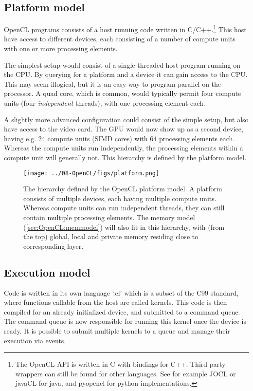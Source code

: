 \subsection{Platform model}
OpenCL programs consists of a host running code written in C/C++.\footnote{The OpenCL API is written in C with bindings for C++. Third party wrappers can still be found for other languages. See for example JOCL or javaCL for java, and pyopencl for python implementations.}
This host have access to different devices, each consisting of a number of compute units with one or more processing elements.

The simplest setup would consist of a single threaded host program running on the CPU. 
By querying for a platform and a device it can gain access to the CPU. 
This may seem illogical, but it is an easy way to program parallel on the processor.
A quad core, which is common, would typically permit four compute units (four \textit{independent} threads), with one processing element each.

A slightly more advanced configuration could consist of the simple setup, but also have access to the video card.
The GPU would now show up as a second device, having e.g. 24 compute units (SIMD cores) with 64 processing elements each. Whereas the compute units run independently, the processing elements within a compute unit will generally not.
This hierarchy is defined by the platform model.

\begin{figure}
\begin{center}
\texttt{[image: ../08-OpenCL/figs/platform.png]}
\caption{The hierarchy defined by the OpenCL platform model.
A platform consists of multiple devices, each having multiple compute units. Whereas compute units can run independent threads, they can still contain multiple processing elements.
The memory model (\ref{sec:OpenCL:memmodel}) will also fit in this hierarchy, with (from the top) global, local and private memory residing close to corresponding layer.}
\label{fig:OpenCL:platform}
\end{center}
\end{figure}


\subsection{Execution model}
Code is written in its own language `.cl' which is a subset of the C99 standard, where functions callable from the host are called kernels.
This code is then compiled for an already initialized device, and submitted to a command queue.
The command queue is now responsible for running this kernel once the device is ready. 
It is possible to submit multiple kernels to a queue and manage their execution via events.

